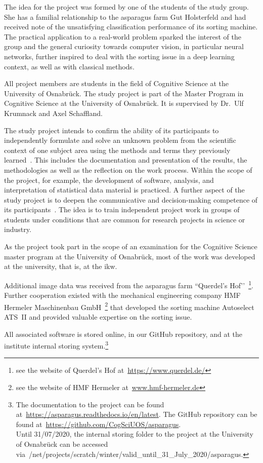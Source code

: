 The idea for the project was formed by one of the students of the study group. She has a familial relationship to the asparagus farm Gut Holsterfeld and had received note of the unsatisfying classification performance of its sorting machine. The practical application to a real-world problem sparked the interest of the group and the general curiosity towards computer vision, in particular neural networks, further inspired to deal with the sorting issue in a deep learning context, as well as with classical methods.

All project members are students in the field of Cognitive Science at the University of Osnabr{\"u}ck. The study project is part of the Master Program in Cognitive Science at the University of Osnabr{\"u}ck. It is supervised by Dr.\ Ulf Krumnack and Axel Schaffland.

The study project intends to confirm the ability of its participants to independently formulate and solve an unknown problem from the scientific context of one subject area using the methods and terms they previously learned~\citep{moduledescription,studyregulations}. This includes the documentation and presentation of the results, the methodologies as well as the reflection on the work process. Within the scope of the project, for example, the development of software, analysis, and interpretation of statistical data material is practiced. A further aspect of the study project is to deepen the communicative and decision-making competence of its participants~\citep{moduledescription}. The idea is to train independent project work in groups of students under conditions that are common for research projects in science or industry.

As the project took part in the scope of an examination for the Cognitive Science master program at the University of Osnabr{\"u}ck, most of the work was developed at the university, that is, at the \acrfull{ikw}. 

Additional image data was received from the asparagus farm ``Querdel’s Hof’’~\footnote{see the website of Querdel’s Hof at~\url{https://www.querdel.de/}}. Further cooperation existed with the mechanical engineering company HMF Hermeler Maschinenbau GmbH~\footnote{see the website of HMF Hermeler at~\url{www.hmf-hermeler.de}} that developed the sorting machine Autoselect ATS~II and provided valuable expertise on the sorting issue.

All associated software is stored online, in our GitHub repository, and at the institute internal storing system.\footnote{The documentation to the project can be found at~\url{https://asparagus.readthedocs.io/en/latest}. The GitHub repository can be found at~\url{https://github.com/CogSciUOS/asparagus}. \\ Until 31/07/2020, the internal storing folder to the project at the University of Osnabr{\"u}ck can be accessed via~/net/projects/scratch/winter/valid\_until\_31\_July\_2020/asparagus.}


